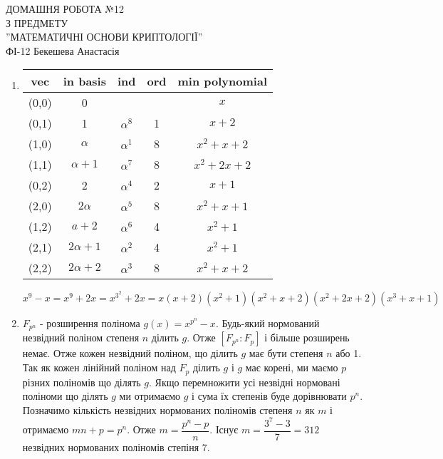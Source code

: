 \documentclass[a4paper,12pt]{article}
\begin{document}
	\begin{justify}
		\thispagestyle{empty}\setlength{\parindent}{0pt}
 		\vspace*{\fill}
  		\begin{center}
  			\noindent\makebox[\linewidth]{\rule{\paperwidth}{0.4pt}}
   			\LARGE{\bigbreak ДОМАШНЯ РОБОТА №12\\З ПРЕДМЕТУ\\''МАТЕМАТИЧНІ ОСНОВИ КРИПТОЛОГІЇ''\\\bigbreak} 
   			ФІ-12 Бекешева Анастасія 
   			\noindent\makebox[\linewidth]{\rule{\paperwidth}{0.4pt}}
  		\end{center}
 		\vspace*{\fill}\newpage
 	\begin{enumerate}
 		\item \begin{table}[htp]\centering
\begin{tabular}{|c|c|c|c|c|}
\hline
vec   & in basis    & ind        & ord & min polynomial \\ \hline
(0,0) & 0           &            &     & $x$            \\ \hline
(0,1) & 1           & $\alpha^8$ & 1   & $x+2$          \\ \hline
(1,0) & $\alpha$    & $\alpha^1$ & 8   & $x^2+x+2$      \\ \hline
(1,1) & $\alpha+1$  & $\alpha^7$ & 8   & $x^2+2x+2$     \\ \hline
(0,2) & 2           & $\alpha^4$ & 2   & $x+1$          \\ \hline
(2,0) & $2\alpha$   & $\alpha^5$ & 8   & $x^2+x+1$      \\ \hline
(1,2) & $a+2$       & $\alpha^6$ & 4   & $x^2+1$        \\ \hline
(2,1) & $2\alpha+1$ & $\alpha^2$ & 4   & $x^2+1$        \\ \hline
(2,2) & $2\alpha+2$ & $\alpha^3$ & 8   & $x^2+x+2$      \\ \hline
\end{tabular}
\end{table}
$x^9-x=x^9+2x=x^{3^2}+2x=x(x+2)(x^2+1)(x^2+x+2)(x^2+2x+2)(x^3+x+1)$
 		\item $F_{p^n}$ - розширення полінома $g(x)=x^{p^n}-x$. Будь-який нормований незвідний поліном степеня $n$ ділить $g$. Отже $[F_{p^n}:F_{p}]$ і більше розширень немає. Отже кожен незвідний поліном, що ділить $g$ має бути степеня $n$ або 1. Так як кожен лінійний поліном над $F_p$ ділить $g$ і $g$ має корені, ми маємо $p$ різних поліномів що ділять $g$. Якщо перемножити усі незвідні нормовані поліноми що ділять $g$ ми отримаємо $g$ і сума їх степенів буде дорівнювати $p^n$. Позначимо кількість незвідних нормованих поліномів степеня $n$ як $m$ і отримаємо $mn+p=p^n$. Отже $m=\dfrac{p^n-p}{n}$. Існує $m=\dfrac{3^7-3}{7}=312$ незвідних нормованих поліномів степіня 7. 

\end{enumerate}
\end{justify}
\end{document}
